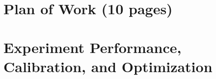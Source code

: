 \documentclass[11pt,onecolumn]{article} %
\begin{document}
\onecolumn


\clearpage


\clearpage
\lhead{}

\tableofcontents
\clearpage

\setcounter{tocdepth}{2}







\section{Plan of Work (10 pages)}


\clearpage

\section{Experiment Performance, Calibration, and Optimization}


\clearpage


\clearpage


\clearpage
















\clearpage
{}



%


%
%
%
%
\end{document}
